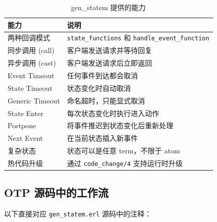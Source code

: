 \documentclass[a4paper,11pt]{article}
\begin{document}
\begin{table}[H]
\centering
\begin{tabular}{@{}ll@{}}
\toprule
\textbf{能力} & \textbf{说明} \\
\midrule
两种回调模式         & \texttt{state\_functions} 和 \texttt{handle\_event\_function} \\
同步调用 (call)      & 客户端发送请求并等待回复 \\
异步调用 (cast)      & 客户端发送请求后立即返回 \\
Event Timeout        & 任何事件到达都会取消 \\
State Timeout        & 状态变化时自动取消 \\
Generic Timeout      & 命名超时，只能显式取消 \\
State Enter          & 每次状态变化时执行进入动作 \\
Postpone             & 将事件推迟到状态变化后重新处理 \\
Next Event           & 在当前状态插入新事件 \\
复杂状态             & 状态可以是任意 term，不限于 atom \\
热代码升级           & 通过 \texttt{code\_change/4} 支持运行时升级 \\
\bottomrule
\end{tabular}
\caption{gen\_statem 提供的能力}
\end{table}

\subsection{OTP 源码中的工作流}

以下直接对应 \texttt{gen\_statem.erl} 源码中的注释：
\end{document}
